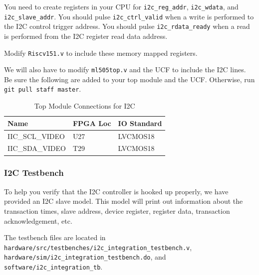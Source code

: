 \documentclass[11pt]{article}
\begin{document}
You need to create registers in your CPU for \verb|i2c_reg_addr|, \verb|i2c_wdata|, and \verb|i2c_slave_addr|. You should pulse \verb|i2c_ctrl_valid| when a write is performed to the I2C control trigger address. You should pulse \verb|i2c_rdata_ready| when a read is performed from the I2C register read data address.

Modify \verb|Riscv151.v| to include these memory mapped registers.

We will also have to modify \verb|ml505top.v| and the UCF to include the I2C lines. Be sure the following are added to your top module and the UCF. Otherwise, run \verb|git pull staff master|. 

\begin{table}[hbt]
	\begin{center}
		\caption{Top Module Connections for I2C}
		\label{i2c_ucf}
		\begin{tabular}{l l l}
			\toprule
			\textbf{Name} & \textbf{FPGA Loc} & \textbf{IO Standard}\\
			\midrule
			IIC\_SCL\_VIDEO & U27  & LVCMOS18 \\
			IIC\_SDA\_VIDEO & T29 & LVCMOS18 
		\end{tabular}
	\end{center}
\end{table}


\subsubsection{I2C Testbench}
To help you verify that the I2C controller is hooked up properly, we have provided an I2C slave model. This model will print out information about the transaction times, slave address, device register, register data, transaction acknowledgement, etc.

The testbench files are located in \verb|hardware/src/testbenches/i2c_integration_testbench.v|, \verb|hardware/sim/i2c_integration_testbench.do|, and \verb|software/i2c_integration_tb|.
\end{document}
